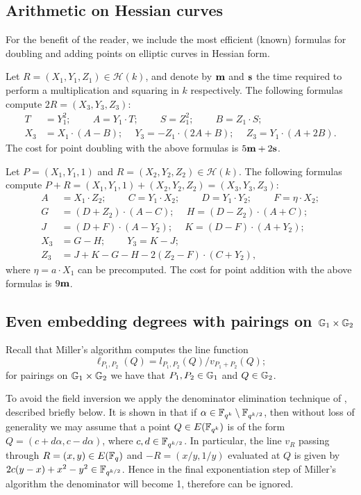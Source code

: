 \subsection{Arithmetic on Hessian curves}

For the benefit of the reader, we include the most efficient (known) formulas
for doubling and adding points on elliptic curves in Hessian form.

Let $R = (X_1, Y_1, Z_1) \in \mathcal{H}(k)$, 
and denote by $\textbf{m}$ and $\textbf{s}$ 
the time required to perform a multiplication and squaring in $k$ respectively.
The following formulas compute $2R = (X_3,Y_3,Z_3)$:
\begin{align*}
T &= Y_1^2;\	\qquad	A = Y_1 \cdot T;\	\qquad
S = Z_1 ^ 2;\	\qquad	B = Z_1 \cdot S;\\
X_3 &= X_1 \cdot (A - B);\	\quad
Y_3 = -Z_1 \cdot (2A + B);\	\quad
Z_3 = Y_1 \cdot (A + 2B).
\end{align*}
The cost for point doubling with the above formulas is $5\textbf{m} + 2\textbf{s}$. 

Let $P = (X_1,Y_1,1)$ and $R = (X_2,Y_2,Z_2) \in \mathcal{H}(k)$.
The following formulas compute
$P + R = (X_1,Y_1,1) + (X_2,Y_2,Z_2) = (X_3,Y_3,Z_3)$:
\begin{align*}
A &= X_1 \cdot Z_2;\	\qquad
C = Y_1 \cdot X_2;\	\qquad
D = Y_1 \cdot Y_2;\	\qquad
F = \eta \cdot X_2;\\
G &= (D + Z_2) \cdot (A - C);\	\quad
H = (D - Z_2) \cdot (A + C);\\
J &= (D + F) \cdot (A - Y_2);\	\quad
K = (D - F) \cdot (A + Y_2);\\
X_3 &= G - H;\	\qquad
Y_3 = K - J;\\
Z_3 &= J + K - G - H - 2(Z_2 - F) \cdot (C + Y_2),
\end{align*}
where $\eta = a\cdot X_1$ can be precomputed.
The cost for point addition with the above formulas is $9\textbf{m}$.

\subsection{Even embedding degrees with pairings on $\mathbb{G}_{1} \times \mathbb{G}_{2}$}

Recall that Miller's algorithm computes the line function 
$$\ell_{P_1,P_2}(Q) = l_{P_1,P_2}(Q)/v_{P_1 + P_2}(Q);$$
for pairings on $\mathbb{G}_{1} \times \mathbb{G}_{2}$ we have that $P_1, P_2 \in \mathbb{G}_{1}$ and $Q \in \mathbb{G}_{2}$.

To avoid the field inversion we apply the denominator elimination technique of \cite{GGX10},
described briefly below. 
It is shown in \cite[Section 4]{GGX10} that if
$\alpha \in \mathbb{F}_{q^k} \setminus \mathbb{F}_{q^{k/2}}$, then
without loss of generality we may assume that a point
$Q \in E(\mathbb{F}_{q^k})$ is of the form
$Q = (c+d\alpha, c-d\alpha )$, where
$c, d \in \mathbb{F}_{q^{k/2}}$.
In particular, the line $v_R$ passing through $R = (x,y) \in E(\mathbb{F}_{q})$ 
and $-R = (x/y, 1/y)$ evaluated at $Q$ is given by
$2c(y-x) + x^2-y^2 \in \mathbb{F}_{q^{k/2}}$.
Hence in the final exponentiation step of Miller's algorithm the denominator will become 1,
therefore can be ignored.

